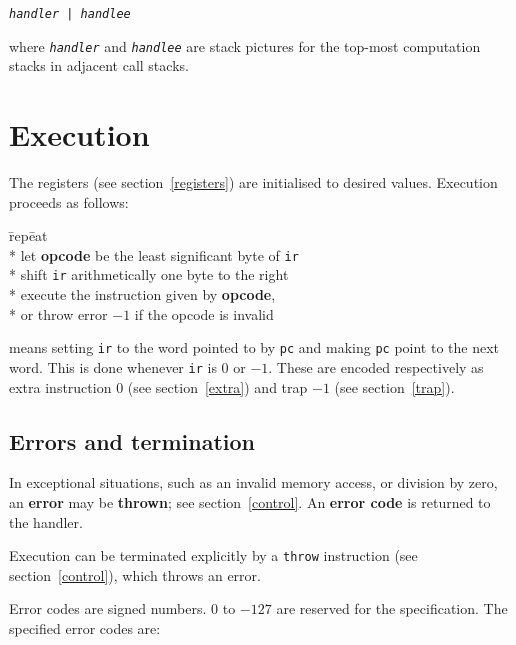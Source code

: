 \documentclass[a4paper]{article}
\newcommand{\spic}[1]{\texttt{\textsl{#1\/}}}
\begin{document}
\begin{center}
  {\tt \spic{handler | handlee}}
\end{center}

\noindent where \spic{handler} and \spic{handlee} are stack pictures for the top-most computation stacks in adjacent call stacks.


\section{Execution}
\label{execution}

The registers (see section~\ref{registers}) are initialised to desired values. Execution proceeds as follows:

\begin{tabbing}
\hspace{0.2in}\=rep\=eat\+\+ \\*
let \textbf{opcode} be the least significant byte of {\tt ir} \\*
shift {\tt ir} arithmetically one byte to the right \\*
execute the instruction given by \textbf{opcode}, \\*
\hspace{1em}or throw error $-1$ if the opcode is invalid \-
\end{tabbing}

 means setting {\tt ir} to the word pointed to by {\tt pc} and making {\tt pc} point to the next word. This is done whenever {\tt ir} is $0$ or $-1$. These are encoded respectively as extra instruction $0$ (see section~\ref{extra}) and trap $-1$ (see section~\ref{trap}).


\subsection{Errors and termination}
\label{errors}

In exceptional situations, such as an invalid memory access, or division by zero, an {\bf error} may be {\bf thrown}; see section~\ref{control}. An {\bf error code} is returned to the handler.

Execution can be terminated explicitly by a {\tt throw} instruction (see section~\ref{control}), which throws an error.

Error codes are signed numbers. $0$ to $-127$ are reserved for the specification. The specified error codes are:
\end{document}
